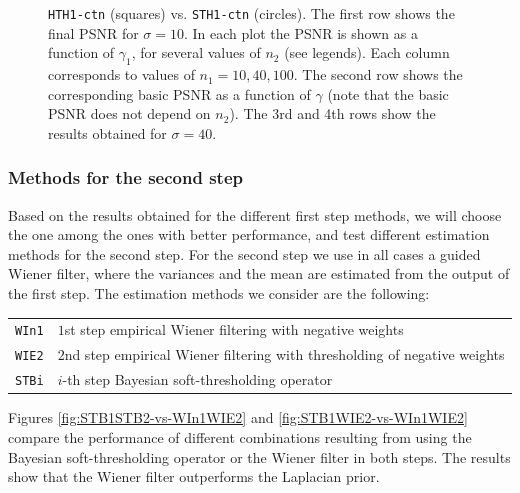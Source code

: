\documentclass{ipol}
\begin{document}
\begin{figure}[ht!]
	\caption{\texttt{HTH1-ctn} (squares) vs. \texttt{STH1-ctn} (circles). The first
	row shows the final PSNR for $\sigma = 10$. In each plot the PSNR is shown
	as a function of $\gamma_1$, for several values of $n_2$ (see legends). Each
	column corresponds to values of $n_1 = 10, 40, 100$. The second row shows the
	corresponding basic PSNR as a function of $\gamma$ (note that the basic PSNR does
	not depend on $n_2$). The 3rd and 4th rows show the results obtained for $\sigma = 40$.}
	\label{fig:HTH1ctn-vs-STH1ctn}
\end{figure}



\clearpage
\subsubsection{Methods for the second step}
Based on the results obtained for the different first step methods, we will choose
the one among the ones with better performance, and test different estimation 
methods for the second step.
For the second step we use in all cases a guided Wiener filter, where the
variances and the mean are estimated from the output of the first step.
The estimation methods we consider are the following:
\begin{center}
\begin{tabular}{c l}
	\verb+WIn1+ & $1$st step empirical Wiener filtering with negative weights\\
	\verb+WIE2+ & $2$nd step empirical Wiener filtering with thresholding of negative weights\\
	\verb+STBi+ & $i$-th step Bayesian soft-thresholding operator\\
\end{tabular}
\end{center}

Figures 
\ref{fig:STB1STB2-vs-WIn1WIE2} and
\ref{fig:STB1WIE2-vs-WIn1WIE2}
compare the performance of different combinations resulting from using the
Bayesian soft-thresholding operator or the Wiener filter in both steps.
The results show that the Wiener filter outperforms the Laplacian prior.
\end{document}
